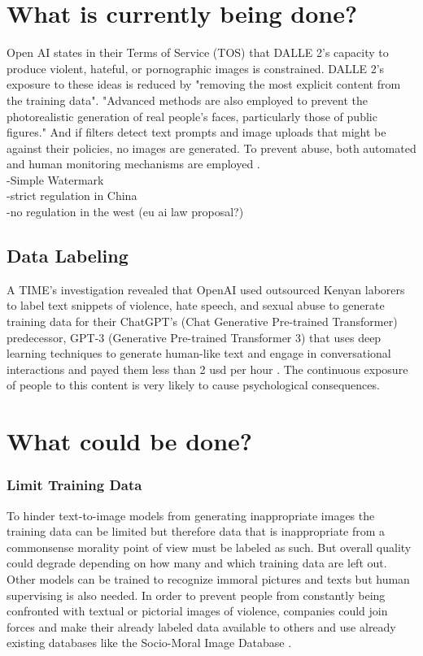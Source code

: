 \documentclass[10pt,twocolumn,twoside]{osajnl}
\begin{document}
\section{What is currently being done?}
\label{section:6}
Open AI states in their Terms of Service (TOS) that DALLE 2's capacity to produce violent, hateful, or pornographic images is constrained. 
DALLE 2's exposure to these ideas is reduced by "removing the most explicit content from the training data". 
"Advanced methods are also employed to prevent the photorealistic generation of real people's faces, particularly those of public figures."
And if filters detect text prompts and image uploads that might be against their policies, no images are generated. To prevent abuse, both automated and human monitoring mechanisms are employed \cite{DallE}. \\
-Simple Watermark\\
-strict regulation in China\\
-no regulation in the west (eu ai law proposal?)\\

\subsection{Data Labeling}
A TIME's investigation revealed that OpenAI used outsourced Kenyan laborers to label text snippets of violence, hate speech, and sexual abuse to generate training data for their ChatGPT’s (Chat Generative Pre-trained Transformer) predecessor, GPT-3 (Generative Pre-trained Transformer 3) that uses deep learning techniques to generate human-like text and engage in conversational interactions and payed them less than 2 usd per hour \cite{KenyaExclusive}. The continuous exposure of people to this content is very likely to cause psychological consequences.

\section{What could be done?}
\subsubsection*{Limit Training Data}
To hinder text-to-image models from generating inappropriate images the training data can be limited but therefore data that is inappropriate from a commonsense morality  point of view must be labeled as such. But overall quality could degrade depending on how many and which training data are left out.\\
Other models can be trained to recognize immoral pictures and texts but human supervising is also needed.
In order to prevent people from constantly being confronted with textual or pictorial images of violence, companies could join forces and make their already labeled data available to others and use already existing databases like the Socio-Moral Image Database \cite{Database}.
\end{document}
